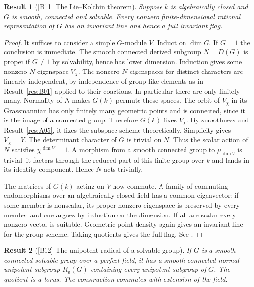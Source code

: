 \documentclass[11pt,a4paper,openany,oneside]{book}
\theoremstyle{resultstyle}
\newtheorem{statement}{Result}[chapter]
\newenvironment{result}[2]{\clubpenalty=10000\begin{statement}[\textnormal{[#1]} #2]\leavevmode\label{res:#1}\ignorespaces}{\end{statement}}
\theoremstyle{definition}
\numberwithin{equation}{chapter}
\begin{document}
\begin{result}{B11}{The Lie--Kolchin theorem}
Suppose \(k\) is algebraically closed and \(G\) is smooth, connected
and solvable. Every nonzero finite-dimensional rational representation
of \(G\) has an invariant line and hence a full invariant flag.
\end{result}

\begin{proof}
It suffices to consider a simple \(G\)-module \(V\).
Induct on \(\dim G\). If \(G=1\) the conclusion is immediate.
The smooth connected derived subgroup \(N=D(G)\) is proper if
\(G\ne1\) by solvability, hence has lower dimension. Induction gives
some nonzero \(N\)-eigenspace \(V_\chi\).
The nonzero \(N\)-eigenspaces for distinct characters are linearly
independent, by independence of group-like elements as in
Result~\ref{res:B01} applied to their coactions. In particular there
are only finitely many. Normality of \(N\) makes \(G(k)\) permute
these spaces. The orbit of \(V_\chi\) in its Grassmannian has
only finitely many geometric points and is connected, since it is
the image of a connected group. Therefore \(G(k)\) fixes
\(V_\chi\). By smoothness and Result~\ref{res:A05}, it fixes the
subspace scheme-theoretically. Simplicity gives \(V_\chi=V\).
The determinant character of \(G\) is trivial on \(N\).
Thus the scalar action of \(N\) satisfies \(\chi^{\dim V}=1\).
A morphism from a smooth connected group to \(\mu_{\dim V}\) is
trivial: it factors through the reduced part of this finite group
over \(k\) and lands in its identity component. Hence \(N\) acts
trivially.

The matrices of \(G(k)\) acting on \(V\) now commute. A family of
commuting endomorphisms over an algebraically closed field has a
common eigenvector: if some member is nonscalar, its proper
nonzero eigenspace is preserved by every member and one argues
by induction on the dimension. If all are scalar every nonzero
vector is suitable. Geometric point density again gives an invariant
line for the group scheme. Taking quotients gives the full flag.
See \cite[Theorem 4.25, Theorem 16.30 and
Corollaries 16.31--16.34]{milne}.
\end{proof}

\begin{result}{B12}{The unipotent radical of a solvable group}
If \(G\) is a smooth connected solvable group over a perfect field,
it has a smooth connected normal unipotent subgroup \(R_u(G)\)
containing every unipotent subgroup of \(G\). The quotient is a torus.
The construction commutes with extension of the field.
\end{result}
\end{document}
